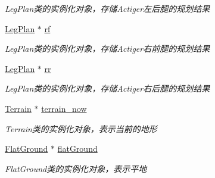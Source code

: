 \begin{DoxyCompactItemize}
\begin{DoxyCompactList}\small\item\em Leg\+Plan类的实例化对象，存储\+Actiger左后腿的规划结果 \end{DoxyCompactList}\item 
\mbox{\label{classquadruped_1_1MotionPlan_a0b4b74a58595e74bd8a1407ef8e82edf}} 
\hyperlink{classquadruped_1_1LegPlan}{Leg\+Plan} $\ast$ \hyperlink{classquadruped_1_1MotionPlan_a0b4b74a58595e74bd8a1407ef8e82edf}{rf}
\begin{DoxyCompactList}\small\item\em Leg\+Plan类的实例化对象，存储\+Actiger右前腿的规划结果 \end{DoxyCompactList}\item 
\mbox{\label{classquadruped_1_1MotionPlan_aa634067d342c0ec0bdf71c5333f84d11}} 
\hyperlink{classquadruped_1_1LegPlan}{Leg\+Plan} $\ast$ \hyperlink{classquadruped_1_1MotionPlan_aa634067d342c0ec0bdf71c5333f84d11}{rr}
\begin{DoxyCompactList}\small\item\em Leg\+Plan类的实例化对象，存储\+Actiger右后腿的规划结果 \end{DoxyCompactList}\item 
\mbox{\label{classquadruped_1_1MotionPlan_ac27061731dfc05e5f2ab3b8b29404a35}} 
\hyperlink{classquadruped_1_1Terrain}{Terrain} $\ast$ \hyperlink{classquadruped_1_1MotionPlan_ac27061731dfc05e5f2ab3b8b29404a35}{terrain\+\_\+now}
\begin{DoxyCompactList}\small\item\em Terrain类的实例化对象，表示当前的地形 \end{DoxyCompactList}\item 
\mbox{\label{classquadruped_1_1MotionPlan_ab985d804440413e397e2e166fd1bb190}} 
\hyperlink{classquadruped_1_1FlatGround}{Flat\+Ground} $\ast$ \hyperlink{classquadruped_1_1MotionPlan_ab985d804440413e397e2e166fd1bb190}{flat\+Ground}
\begin{DoxyCompactList}\small\item\em Flat\+Ground类的实例化对象，表示平地 \end{DoxyCompactList}\item 
\mbox{\label{classquadruped_1_1MotionPlan_a12274c307b46b1b6e04385095427e46c}} 

\end{DoxyCompactItemize}
